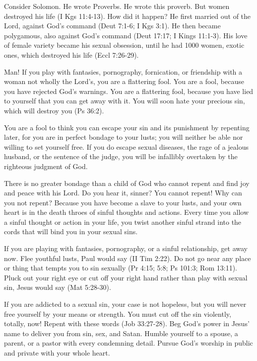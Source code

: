 Consider Solomon. He wrote Proverbs. He wrote this proverb. But women destroyed his life (I Kgs 11:4-13). How did it happen? He first married out of the Lord, against God’s command (Deut 7:1-6; I Kgs 3:1). He then became polygamous, also against God’s command (Deut 17:17; I Kings 11:1-3). His love of female variety became his sexual obsession, until he had 1000 women, exotic ones, which destroyed his life (Eccl 7:26-29).

Man! If you play with fantasies, pornography, fornication, or friendship with a woman not wholly the Lord’s, you are a flattering fool. You are a fool, because you have rejected God’s warnings. You are a flattering fool, because you have lied to yourself that you can get away with it. You will soon hate your precious sin, which will destroy you (Ps 36:2).

You are a fool to think you can escape your sin and its punishment by repenting later, for you are in perfect bondage to your lusts; you will neither be able nor willing to set yourself free. If you do escape sexual diseases, the rage of a jealous husband, or the sentence of the judge, you will be infallibly overtaken by the righteous judgment of God.

There is no greater bondage than a child of God who cannot repent and find joy and peace with his Lord. Do you hear it, sinner? You cannot repent! Why can you not repent? Because you have become a slave to your lusts, and your own heart is in the death throes of sinful thoughts and actions. Every time you allow a sinful thought or action in your life, you twist another sinful strand into the cords that will bind you in your sexual sins.

If you are playing with fantasies, pornography, or a sinful relationship, get away now. Flee youthful lusts, Paul would say (II Tim 2:22). Do not go near any place or thing that tempts you to sin sexually (Pr 4:15; 5:8; Ps 101:3; Rom 13:11). Pluck out your right eye or cut off your right hand rather than play with sexual sin, Jesus would say (Mat 5:28-30).

If you are addicted to a sexual sin, your case is not hopeless, but you will never free yourself by your means or strength. You must cut off the sin violently, totally, now! Repent with these words (Job 33:27-28). Beg God’s power in Jesus’ name to deliver you from sin, sex, and Satan. Humble yourself to a spouse, a parent, or a pastor with every condemning detail. Pursue God’s worship in public and private with your whole heart.

